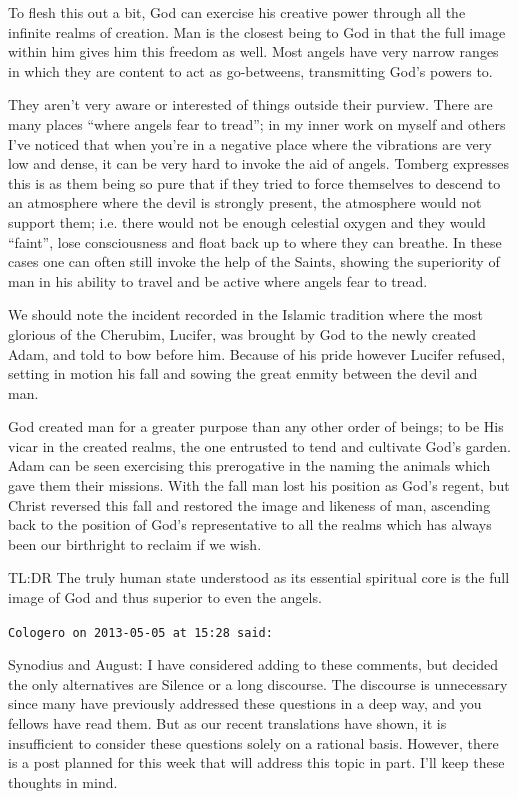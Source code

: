 \begin{footnotesize}
\begin{sffamily}
To flesh this out a bit, God can exercise his creative power through all the infinite realms of creation. Man is the closest being to God in that the full image within him gives him this freedom as well. Most angels have very narrow ranges in which they are content to act as go-betweens, transmitting God's powers to.

They aren't very aware or interested of things outside their purview. There are many places ``where angels fear to tread''; in my inner work on myself and others I've noticed that when you're in a negative place where the vibrations are very low and dense, it can be very hard to invoke the aid of angels. Tomberg expresses this is as them being so pure that if they tried to force themselves to descend to an atmosphere where the devil is strongly present, the atmosphere would not support them; i.e. there would not be enough celestial oxygen and they would ``faint'', lose consciousness and float back up to where they can breathe. In these cases one can often still invoke the help of the Saints, showing the superiority of man in his ability to travel and be active where angels fear to tread.

We should note the incident recorded in the Islamic tradition where the most glorious of the Cherubim, Lucifer, was brought by God to the newly created Adam, and told to bow before him. Because of his pride however Lucifer refused, setting in motion his fall and sowing the great enmity between the devil and man.

God created man for a greater purpose than any other order of beings; to be His vicar in the created realms, the one entrusted to tend and cultivate God's garden. Adam can be seen exercising this prerogative in the naming the animals which gave them their missions. With the fall man lost his position as God's regent, but Christ reversed this fall and restored the image and likeness of man, ascending back to the position of God's representative to all the realms which has always been our birthright to reclaim if we wish.

TL:DR The truly human state understood as its essential spiritual core is the full image of God and thus superior to even the angels.

\hfill

\texttt{Cologero on 2013-05-05 at 15:28 said:}

Synodius and August: I have considered adding to these comments, but decided the only alternatives are Silence or a long discourse. The discourse is unnecessary since many have previously addressed these questions in a deep way, and you fellows have read them. But as our recent translations have shown, it is insufficient to consider these questions solely on a rational basis. However, there is a post planned for this week that will address this topic in part. I'll keep these thoughts in mind.


\end{sffamily}
\end{footnotesize}
